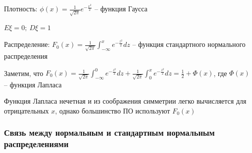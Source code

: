 \documentclass[12pt]{article}
\begin{document}
    Плотность: $\phi(x) = \frac{1}{\sqrt{2\pi}} e^{-\frac{x^2}{2}}$ -- функция Гаусса

    $E\xi = 0; \ D\xi = 1$

    Распределение: $F_0(x) = \frac{1}{\sqrt{2\pi}} \int_{-\infty}^x e^{-\frac{z^2}{2}} dz$ -- функция стандартного нормального распределения

    Заметим, что $F_0(x) = \frac{1}{\sqrt{2\pi}} \int_{-\infty}^0 e^{-\frac{z^2}{2}} dz + \frac{1}{\sqrt{2\pi}} \int_0^x e^{-\frac{z^2}{2}} dz = \frac{1}{2} + \Phi(x)$, где $\Phi(x)$ -- функция Лапласа

    Функция Лапласа нечетная и из соображения симметрии легко вычисляется для отрицательных $x$, однако большинство ПО используют $F_0(x)$
    
    \hypertarget{connectionbetweennormalandstandard}{}

    \subsubsection{Связь между нормальным и стандартным нормальным распределениями}
\end{document}

